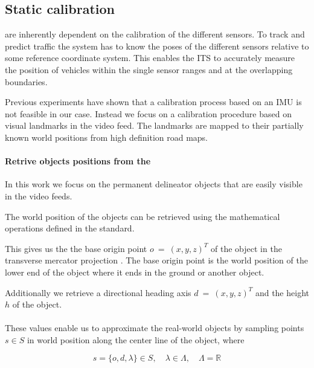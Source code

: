 
\subsection{Static calibration}

\ITS{} are inherently dependent on the calibration of the different sensors. 
To track and predict traffic the system has to know the poses of the different sensors relative to some reference coordinate system.
This enables the ITS to accurately measure the position of vehicles within the single sensor ranges and at the overlapping boundaries.

Previous experiments have shown that a calibration process based on an IMU is not feasible in our case. 
Instead we focus on a calibration procedure based on visual landmarks in the video feed.
The landmarks are mapped to their partially known world positions from high definition road maps. 

\paragraph{Retrive objects positions from the \HDmaps}
In this work we focus on the permanent delineator objects that are easily visible in the video feeds.

The world position of the objects can be retrieved using the mathematical operations defined in the \OD{} standard.

This gives us the the base origin point $o~=~(x, y, z)^T$ of the object in the transverse mercator projection \cite{proj}. 
The base origin point is the world position of the lower end of the object where it ends in the ground or another object.

Additionally we retrieve a directional heading axis $d~=~(x, y, z)^T$ and the height $h$ of the object.
\\
\\
These values enable us to approximate the real-world objects by sampling points $s \in S$ in world position 
along the center line of the object, where 

\begin{equation}
s = \{o, d, \lambda\} \in S, \quad \lambda \in \Lambda,  \quad \Lambda = \mathbb{R}
\end{equation}

